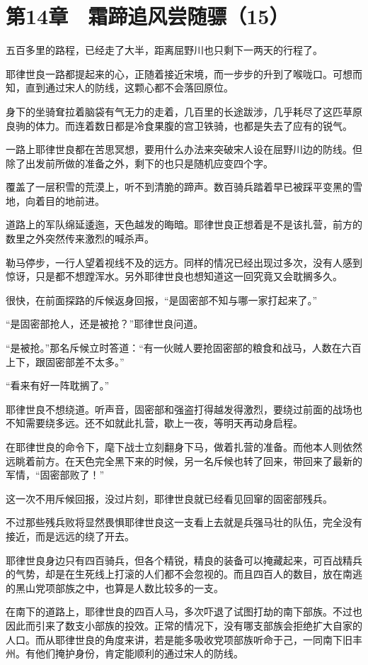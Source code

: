\section{第14章　霜蹄追风尝随骠（15）}

五百多里的路程，已经走了大半，距离屈野川也只剩下一两天的行程了。

耶律世良一路都提起来的心，正随着接近宋境，而一步步的升到了喉咙口。可想而知，直到通过宋人的防线，这颗心都不会落回原位。

身下的坐骑耷拉着脑袋有气无力的走着，几百里的长途跋涉，几乎耗尽了这匹草原良驹的体力。而连着数日都是冷食果腹的宫卫铁骑，也都是失去了应有的锐气。

一路上耶律世良都在苦思冥想，要用什么办法来突破宋人设在屈野川边的防线。但除了出发前所做的准备之外，剩下的也只是随机应变四个字。

覆盖了一层积雪的荒漠上，听不到清脆的蹄声。数百骑兵踏着早已被踩平变黑的雪地，向着目的地前进。

道路上的军队绵延逶迤，天色越发的晦暗。耶律世良正想着是不是该扎营，前方的数里之外突然传来激烈的喊杀声。

勒马停步，一行人望着视线不及的远方。同样的情况已经出现过多次，没有人感到惊讶，只是都不想蹚浑水。另外耶律世良也想知道这一回究竟又会耽搁多久。

很快，在前面探路的斥候返身回报，“是固密部不知与哪一家打起来了。”

“是固密部抢人，还是被抢？”耶律世良问道。

“是被抢。”那名斥候立时答道：“有一伙贼人要抢固密部的粮食和战马，人数在六百上下，跟固密部差不太多。”

“看来有好一阵耽搁了。”

耶律世良不想绕道。听声音，固密部和强盗打得越发得激烈，要绕过前面的战场也不知需要绕多远。还不如就此扎营，歇上一夜，等明天再动身启程。

在耶律世良的命令下，麾下战士立刻翻身下马，做着扎营的准备。而他本人则依然远眺着前方。在天色完全黑下来的时候，另一名斥候也转了回来，带回来了最新的军情，“固密部败了！”

这一次不用斥候回报，没过片刻，耶律世良就已经看见回窜的固密部残兵。

不过那些残兵败将显然畏惧耶律世良这一支看上去就是兵强马壮的队伍，完全没有接近，而是远远的绕了开去。

耶律世良身边只有四百骑兵，但各个精锐，精良的装备可以掩藏起来，可百战精兵的气势，却是在生死线上打滚的人们都不会忽视的。而且四百人的数目，放在南逃的黑山党项部族之中，也算是人数比较多的一支。

在南下的道路上，耶律世良的四百人马，多次吓退了试图打劫的南下部族。不过也因此而引来了数支小部族的投效。正常的情况下，没有哪支部族会拒绝扩大自家的人口。而从耶律世良的角度来讲，若是能多吸收党项部族听命于己，一同南下旧丰州。有他们掩护身份，肯定能顺利的通过宋人的防线。

